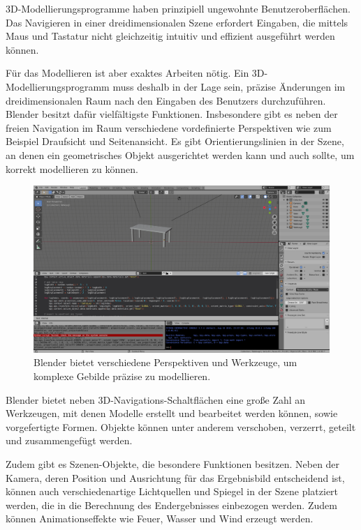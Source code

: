 3D-Modellierungsprogramme haben prinzipiell ungewohnte Benutzeroberflächen. Das Navigieren in einer dreidimensionalen Szene erfordert Eingaben, die mittels Maus und Tastatur nicht gleichzeitig intuitiv und effizient ausgeführt werden können.

Für das Modellieren ist aber exaktes Arbeiten nötig. Ein 3D-Modellierungsprogramm muss deshalb in der Lage sein, präzise Änderungen im dreidimensionalen Raum nach den Eingaben des Benutzers durchzuführen. Blender besitzt dafür vielfältigste Funktionen. Insbesondere gibt es neben der freien Navigation im Raum verschiedene vordefinierte Perspektiven wie zum Beispiel Draufsicht und Seitenansicht. Es gibt Orientierungslinien in der Szene, an denen ein geometrisches Objekt ausgerichtet werden kann und auch sollte, um korrekt modellieren zu können.

\begin{figure}[h]
	\centering
	\includegraphics[width=1\textwidth]{bilder/blender.png}

	\caption[Blender-Arbeitsbereich]{Blender bietet verschiedene Perspektiven und Werkzeuge, um komplexe Gebilde präzise zu modellieren. }

	\label{fig:blender}
\end{figure}

Blender bietet neben 3D-Navigations-Schaltflächen eine große Zahl an Werkzeugen, mit denen Modelle erstellt und bearbeitet werden können, sowie vorgefertigte Formen. Objekte können unter anderem verschoben, verzerrt, geteilt und zusammengefügt werden.

Zudem gibt es Szenen-Objekte, die besondere Funktionen besitzen. Neben der Kamera, deren Position und Ausrichtung für das Ergebnisbild entscheidend ist, können auch verschiedenartige Lichtquellen und Spiegel in der Szene platziert werden, die in die Berechnung des Endergebnisses einbezogen werden. Zudem können Animationseffekte wie Feuer, Wasser und Wind erzeugt werden.
\pagebreak

